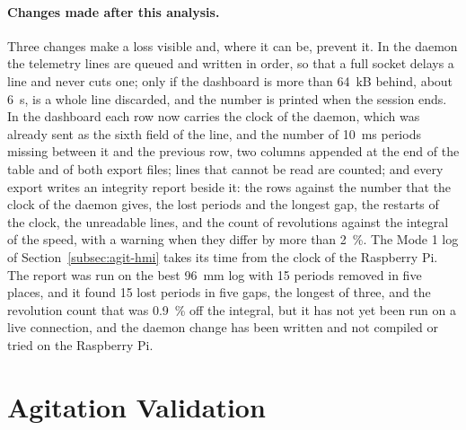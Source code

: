\paragraph{Changes made after this analysis.}
Three changes make a loss visible and, where it can be, prevent it. In the daemon the telemetry lines are queued and written in order, so that a full socket delays a line and never cuts one; only if the dashboard is more than 64~kB behind, about 6~s, is a whole line discarded, and the number is printed when the session ends. In the dashboard each row now carries the clock of the daemon, which was already sent as the sixth field of the line, and the number of 10~ms periods missing between it and the previous row, two columns appended at the end of the table and of both export files; lines that cannot be read are counted; and every export writes an integrity report beside it: the rows against the number that the clock of the daemon gives, the lost periods and the longest gap, the restarts of the clock, the unreadable lines, and the count of revolutions against the integral of the speed, with a warning when they differ by more than 2~\%. The Mode 1 log of Section~\ref{subsec:agit-hmi} takes its time from the clock of the Raspberry Pi. The report was run on the best 96~mm log with 15 periods removed in five places, and it found 15 lost periods in five gaps, the longest of three, and the revolution count that was 0.9~\% off the integral, but it has not yet been run on a live connection, and the daemon change has been written and not compiled or tried on the Raspberry Pi. %


\section{Agitation Validation}
\label{sec:agit-validation}

